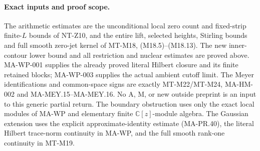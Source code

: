 \paragraph{Exact inputs and proof scope.}
The arithmetic estimates are the unconditional local
zero count and fixed-strip finite-$L$ bounds of NT-Z10,
and the entire lift, selected heights, Stirling bounds
and full smooth zero-jet kernel of MT-M18,
(M18.5)--(M18.13).  The new inner-contour lower bound
and all restriction and nuclear estimates are proved
above.  MA-WP-001 supplies the already proved literal
Hilbert closure and its finite retained blocks;
MA-WP-003 supplies the actual ambient cutoff limit.
The Meyer identifications and common-space signs
are exactly MT-M22/MT-M24, MA-HM-002 and
MA-MEY.15--MA-MEY.16.  No A, M, or new outside
preprint is an input to this generic partial return.
The boundary obstruction uses only the exact
local modules of MA-WP and elementary finite
$\mathbb C[z]$-module algebra.  The Gaussian
extension uses the explicit approximate-identity
estimate (MA-PR.40), the literal Hilbert
trace-norm continuity in MA-WP, and the full
smooth rank-one continuity in MT-M19.
